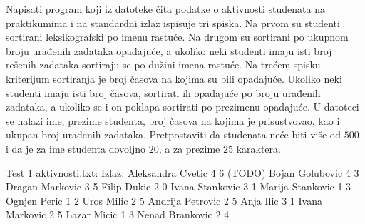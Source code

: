 \begin{Exercise}[label=513]
   Napisati program koji iz datoteke  čita
   podatke o aktivnosti studenata na praktikumima i na standardni
   izlaz ispisuje tri spiska. Na prvom su studenti sortirani
   leksikografski po imenu rastuće. Na drugom su sortirani po ukupnom
   broju urađenih zadataka opadajuće, a ukoliko neki studenti imaju
   isti broj rešenih zadataka sortiraju se po dužini imena rastuće. Na
   trećem spisku kriterijum sortiranja je broj časova na kojima su
   bili opadajuće. Ukoliko neki studenti imaju isti broj časova,
   sortirati ih opadajuće po broju urađenih zadataka, a ukoliko se i
   on poklapa sortirati po prezimenu opadajuće. U datoteci se nalazi
   ime, prezime studenta, broj časova na kojima je prisustvovao, kao i
   ukupan broj urađenih zadataka. Pretpostaviti da studenata neće biti
   više od $500$ i da je za ime studenta dovoljno $20$, a za prezime $25$
   karaktera.
  
\begin{miditest}
\begin{test}{Test 1}
aktivnosti.txt:               Izlaz:
Aleksandra Cvetic 4 6         (TODO)
Bojan Golubovic 4 3
Dragan Markovic 3 5
Filip Dukic 2 0 
Ivana Stankovic 3 1
Marija Stankovic 1 3 
Ognjen Peric 1 2
Uros Milic 2 5
Andrija Petrovic 2 5
Anja Ilic 3 1
Ivana Markovic 2 5
Lazar Micic 1 3
Nenad Brankovic 2 4
\end{test}
\end{miditest}
  
\end{Exercise}

